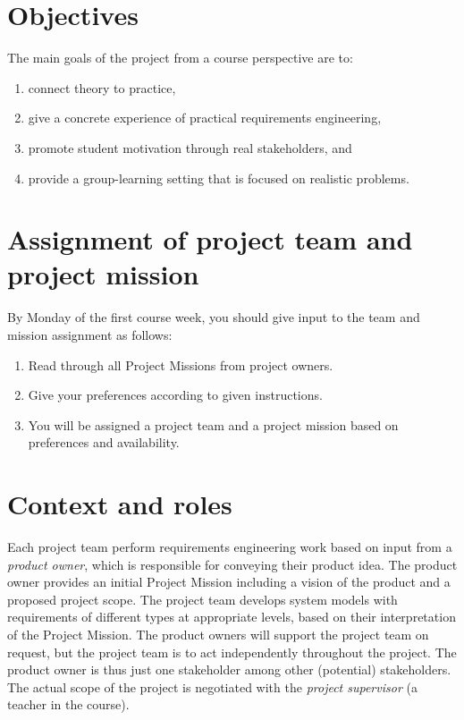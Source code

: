 
\maketitle
\vspace{-1cm}

\section{Objectives}
The main goals of the project from a course perspective are to:
\begin{enumerate}[nolistsep]
\item connect theory to practice,
\item give a concrete experience of practical requirements engineering,
\item promote student motivation through real stakeholders, and
\item provide a group-learning setting that is focused on realistic problems.
\end{enumerate}

\section{Assignment of project team and project mission}
By Monday of the first course week, you should give input to the team and mission
assignment as follows:
\begin{enumerate}[nolistsep]
\item Read through all Project Missions from project owners.
\item  Give your preferences according to given instructions.
\item  You will be assigned a project team and a project mission based on preferences
and availability.
\end{enumerate}

\section{Context and roles}

\noindent Each project team perform requirements engineering work based on input from a \textit{product owner}, which is responsible for conveying their product idea. The product owner provides an initial Project Mission including a vision of the product and a proposed project scope. The project team develops system models with requirements of different types at appropriate levels, based on their interpretation of the Project Mission. The product owners will support the project team on request, but the project team is to act independently throughout the project. The product owner is thus just one stakeholder among other (potential) stakeholders. The actual scope of the project is negotiated with the \textit{project supervisor} (a teacher in the course).

